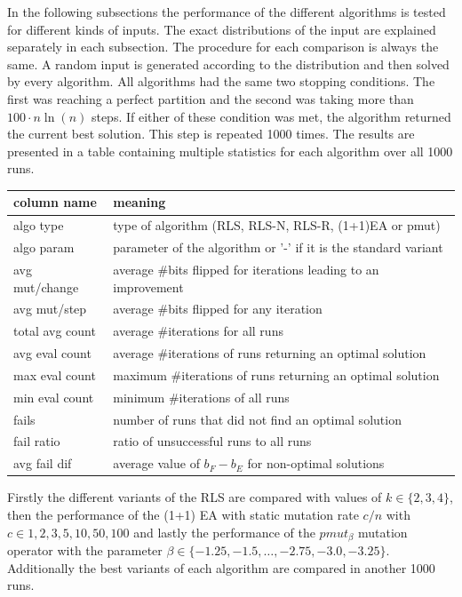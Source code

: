 In the following subsections the performance of the different algorithms is tested for different kinds of inputs.
The exact distributions of the input are explained separately in each subsection.
The procedure for each comparison is always the same. A random input is generated according to the distribution and then solved by every algorithm.
All algorithms had the same two stopping conditions.
The first was reaching a perfect partition and the second was taking more than $100 \cdot n\ln(n)$ steps.
If either of these condition was met, the algorithm returned the current best solution.
This step is repeated 1000 times.
The results are presented in a table containing multiple statistics for each algorithm over all 1000 runs.

\begin{tabular}{m{3cm} | m{15cm}}
      column name     & meaning                                                         \\ \hline
      algo type       & type of algorithm (RLS, RLS-N, RLS-R, (1+1)EA or pmut)          \\
      algo param      & parameter of the algorithm or '-' if it is the standard variant \\
      avg mut/change  & average \#bits flipped for iterations leading to an improvement \\
      avg mut/step    & average \#bits flipped for any iteration                        \\
      total avg count & average \#iterations for all runs                               \\
      avg eval count  & average \#iterations of runs returning an optimal solution      \\
      max eval count  & maximum \#iterations of runs returning an optimal solution      \\
      min eval count  & minimum \#iterations of all runs                                \\
      fails           & number of runs that did not find an optimal solution            \\
      fail ratio      & ratio of unsuccessful runs to all runs                          \\
      avg fail dif    & average value of $b_F-b_E$ for non-optimal solutions            \\
\end{tabular}

Firstly the different variants of the RLS are compared with values of $k \in\{2,3,4\}$, then the performance of the (1+1) EA with static mutation rate $c/n$ with $c \in{1,2,3,5,10,50,100}$ and lastly the performance of the $pmut_\beta$ mutation operator with the parameter $\beta \in \{-1.25, -1.5, \dots, -2.75,-3.0,-3.25\}$. Additionally the best variants of each algorithm are compared in another 1000 runs.

